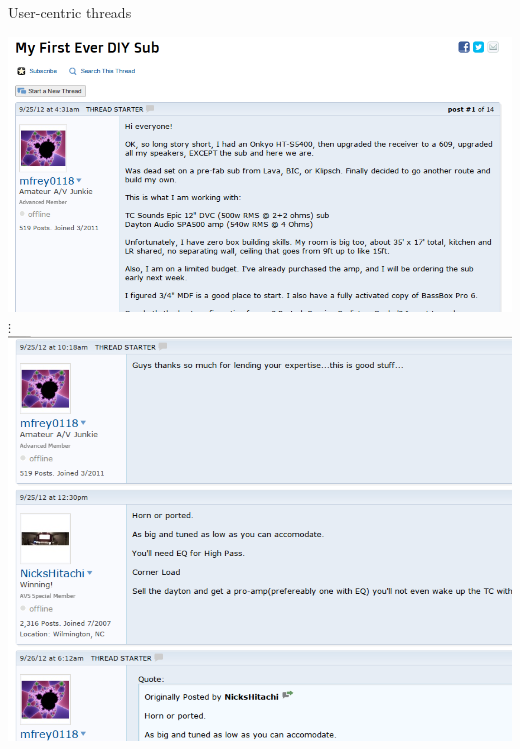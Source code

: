 \documentclass[12pt]{../presentation}
\begin{document}
\begin{frame}{User-centric threads}
	\begin{center}
		\includegraphics[scale=0.2]{screenshots/revolve_user.png}\\
			$\vdots$\\
		\includegraphics[scale=0.2]{screenshots/revolve_user2.png}
	\end{center}
\end{frame}
\end{document}
